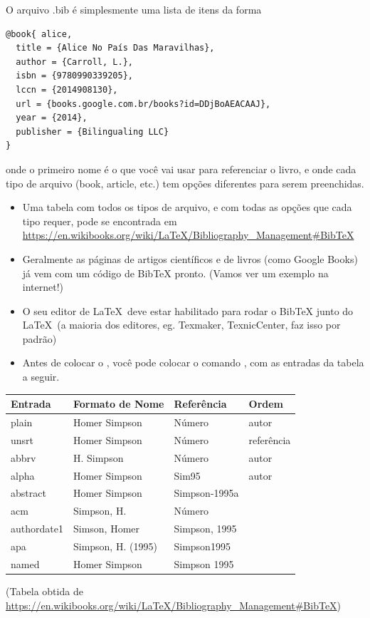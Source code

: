 \documentclass[12pt]{beamer}
\begin{document}
\begin{frame}[fragile]
  O arquivo .bib é simplesmente uma lista de itens da forma
  \begin{verbatim}
@book{ alice,
  title = {Alice No País Das Maravilhas},
  author = {Carroll, L.},
  isbn = {9780990339205},
  lccn = {2014908130},
  url = {books.google.com.br/books?id=DDjBoAEACAAJ},
  year = {2014},
  publisher = {Bilingualing LLC}
}
  \end{verbatim}
  onde o primeiro nome é o que você vai usar para referenciar o livro, e onde cada tipo de arquivo (book, article, etc.) tem opções diferentes para serem preenchidas.
\end{frame}

\begin{frame}[fragile]
  \begin{itemize}
    \item Uma tabela com todos os tipos de arquivo, e com todas as opções que cada tipo requer, pode se encontrada em \url{https://en.wikibooks.org/wiki/LaTeX/Bibliography_Management\#BibTeX}
    \item Geralmente as páginas de artigos científicos e de livros (como Google Books) já vem com um código de BibTeX pronto. (Vamos ver um exemplo na internet!)
    \item O seu editor de \LaTeX\ deve estar habilitado para rodar o BibTeX junto do \LaTeX\ (a maioria dos editores, eg. Texmaker, TexnicCenter, faz isso por padrão)
    \item Antes de colocar o \verb++, você pode colocar o comando \verb++, com as entradas da tabela a seguir.
  \end{itemize}
\end{frame}

\begin{frame}
  \begin{table}[h]
    \small
    \begin{tabular}{|l|l|l|l|}
      \hline
      \textbf{Entrada} & \textbf{Formato de Nome} & \textbf{Referência} & \textbf{Ordem}\\
      \hline
      plain & Homer Simpson & Número & autor\\
      \hline
      unsrt & Homer Simpson & Número & referência\\
      \hline
      abbrv & H. Simpson & Número & autor\\
      \hline
      alpha & Homer Simpson & Sim95 & autor\\
      \hline
      abstract & Homer Simpson & Simpson-1995a & \\
      \hline
      acm & Simpson, H. & Número & \\
      \hline
      authordate1 & Simson, Homer & Simpson, 1995 & \\
      \hline
      apa & Simpson, H. (1995) & Simpson1995 & \\
      \hline
      named & Homer Simpson & Simpson 1995 & \\
      \hline
    \end{tabular}
  \end{table}
  (Tabela obtida de \url{https://en.wikibooks.org/wiki/LaTeX/Bibliography_Management\#BibTeX})
\end{frame}
\end{document}
